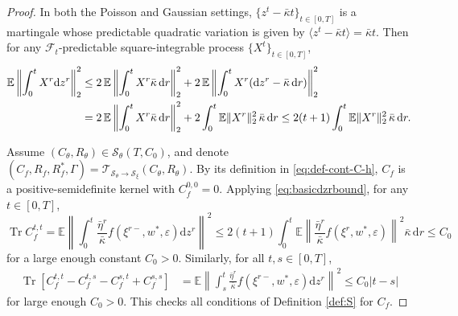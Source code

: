 \documentclass[11pt,letterpaper,reqno]{amsart}
\theoremstyle{definition}
\def\eps{\varepsilon}
\def\d{\mathrm{d}}
\def\E{\mathbb{E}}
\def\Tr{\operatorname{Tr}}
\def\cF{\mathcal{F}}
\def\Ct{C_\theta}
\def\Rt{R_\theta}
\def\Cf{C_f}
\def\trsfrmB{\mathcal{T}_{{\mathcal{S}}_\theta \to \mathcal{S}_\xi}}
\begin{document}
\begin{proof}
In both the Poisson and Gaussian settings,
$\{z^t-\bar \kappa t\}_{t \in [0,T]}$ is a
martingale whose predictable quadratic variation is given by
$\langle z^t-\bar \kappa t
\rangle=\bar \kappa t$. Then for any $\cF_t$-predictable square-integrable
process $\{X^t\}_{t \in [0,T]}$,
\begin{align}
\E\left\|\int_0^t X^r \d z^r\right\|_2^2
&\leq 2\,\E\left\|\int_0^t X^r \bar \kappa\,\d r\right\|_2^2
+2\,\E\left\|\int_0^t X^r (\d z^r-\bar \kappa\,\d r)\right\|_2^2\notag\\
&=2\,\E\left\|\int_0^t X^r \bar \kappa\,\d r\right\|_2^2
+2\int_0^t \E\|X^r\|_2^2\,\bar\kappa\,\d r
\leq 2(t+1)\int_0^t \E\|X^r\|_2^2\,\bar\kappa\,\d r.\label{eq:basicdzrbound}
\end{align}

Assume $(\Ct,\Rt) \in {\mathcal{S}}_\theta(T,C_0)$, and denote
$(C_f,R_f,R_f^*,\Gamma)=\trsfrmB(C_\theta,R_\theta)$.
By its definition in \eqref{eq:def-cont-C-h},
$C_f$ is a positive-semidefinite kernel with $C_f^{0,0}=0$.
Applying \eqref{eq:basicdzrbound}, for any $t \in [0,T]$,
\[\Tr \Cf^{t,t}=\E\left\|\int_0^t
\frac{\bar\eta^r}{\bar\kappa}f(\xi^{r-},w^*,\eps)\d z^r\right\|^2
\leq 2(t+1)\int_0^t \E\left\|\frac{\bar \eta^r}{\bar \kappa}
f(\xi^r,w^*,\eps)\right\|^2\bar \kappa\,\d r
\leq C_0\]
for a large enough constant $C_0>0$. Similarly, for all $t,s \in [0,T]$,
\begin{align*}
\Tr[\Cf^{t,t} - \Cf^{t,s} - \Cf^{s,t} + \Cf^{s,s}] &=\E\left\|\int_s^t
\frac{\bar\eta^r}{\bar\kappa}f(\xi^{r-},w^*,\eps)\d z^r\right\|^2
\leq C_0|t-s|
\end{align*}
for large enough $C_0>0$.
This checks all conditions of Definition \ref{def:S} for $C_f$.


\end{proof}
\end{document}
